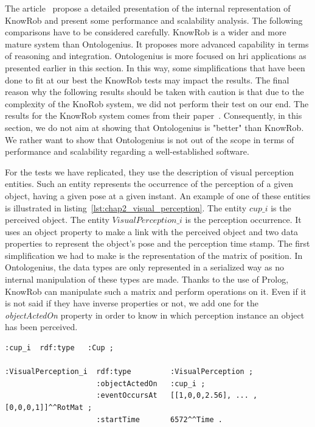 The article~\cite{tenorth_2017_representations} propose a detailed presentation of the internal representation of KnowRob and present some performance and scalability analysis. The following comparisons have to be considered carefully. KnowRob is a wider and more mature system than Ontologenius. It proposes more advanced capability in terms of reasoning and integration. Ontologenius is more focused on \acrshort{hri} applications as presented earlier in this section. In this way, some simplifications that have been done to fit at our best the KnowRob tests may impact the results. The final reason why the following results should be taken with caution is that due to the complexity of the KnoRob system, we did not perform their test on our end. The results for the KnowRob system comes from their paper~\cite{tenorth_2017_representations}. Consequently, in this section, we do not aim at showing that Ontologenius is "better" than KnowRob. We rather want to show that Ontologenius is not out of the scope in terms of performance and scalability regarding a well-established software.

For the tests we have replicated, they use the description of visual perception entities. Such an entity represents the occurrence of the perception of a given object, having a given pose at a given instant. An example of one of these entities is illustrated in listing~\ref{lst:chap2_visual_perception}. The entity $cup\_i$ is the perceived object. The entity $VisualPerception\_i$ is the perception occurrence. It uses an object property to make a link with the perceived object and two data properties to represent the object's pose and the perception time stamp. The first simplification we had to make is the representation of the matrix of position. In Ontologenius, the data types are only represented in a serialized way as no internal manipulation of these types are made. Thanks to the use of Prolog, KnowRob can manipulate such a matrix and perform operations on it. Even if it is not said if they have inverse properties or not, we add one for the \textit{objectActedOn} property in order to know in which perception instance an object has been perceived.

\begin{lstlisting}[frame=single, basicstyle=\scriptsize\ttfamily, label={lst:chap2_visual_perception}, caption={Description of a visual perception entity created in a somparable way as in the Knowrob system. The description is provided in the OWL language using the Turle syntax.},captionpos=b, style=OwlTurtle_indiv]
:cup_i  rdf:type   :Cup ;

:VisualPerception_i  rdf:type         :VisualPerception ;
                     :objectActedOn   :cup_i ;
                     :eventOccursAt   [[1,0,0,2.56], ... ,[0,0,0,1]]^^RotMat ;
                     :startTime       6572^^Time .
\end{lstlisting}

